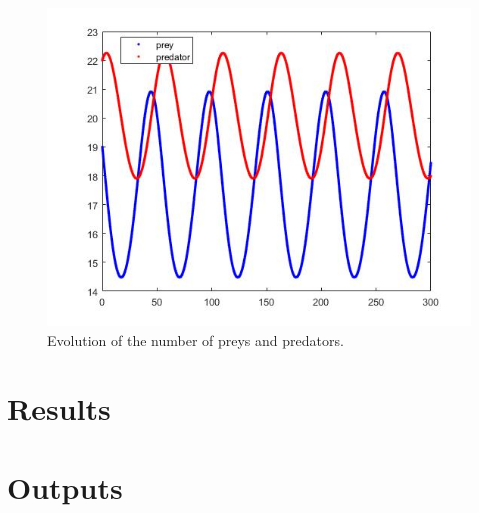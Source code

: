 \documentclass[a4paper, 11pt]{article}
\begin{document}
	\begin{figure}[H]
		\centering
		\includegraphics[width=\linewidth]{ex5.jpg}
		\caption{Evolution of the number of preys and predators.}
		\label{fig:ex5}
	\end{figure}

	
	\section*{Results}
	
	
	\section*{Outputs}
	
	
	
\end{document}
